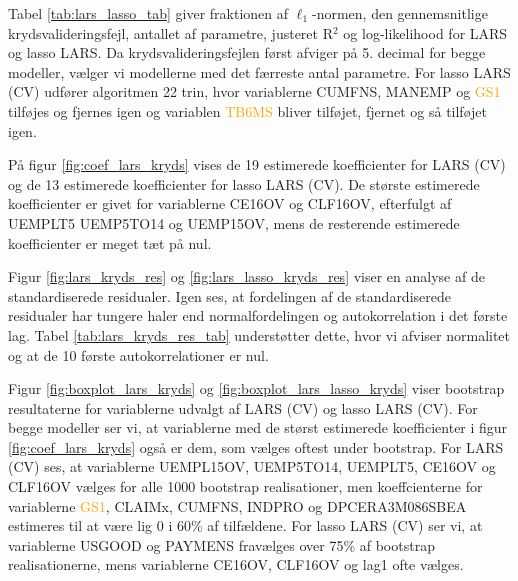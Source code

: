 
Tabel \ref{tab:lars_lasso_tab} giver fraktionen af \(\ell_1\)-normen, den gennemsnitlige krydsvalideringsfejl, antallet af parametre, justeret R$^2$ og log-likelihood for LARS og lasso LARS.
Da krydsvalideringsfejlen først afviger på 5. decimal for begge modeller, vælger vi modellerne med det færreste antal parametre. 
For lasso LARS (CV) udfører algoritmen 22 trin, hvor variablerne  \textcolor{chartreuse4}{CUMFNS}, \textcolor{blue3}{MANEMP} og \textcolor{orange}{GS1} tilføjes og fjernes igen og 
variablen \textcolor{orange}{TB6MS} bliver tilføjet, fjernet og så tilføjet igen.  

%

%
På figur \ref{fig:coef_lars_kryds} vises de 19 estimerede koefficienter for LARS (CV) og de 13 estimerede koefficienter for lasso LARS (CV). 
De største estimerede koefficienter er givet for variablerne \textcolor{blue3}{CE16OV} og \textcolor{blue3}{CLF16OV}, efterfulgt af \textcolor{blue3}{UEMPLT5} \textcolor{blue3}{UEMP5TO14} og \textcolor{blue3}{UEMP15OV}, mens de resterende estimerede koefficienter er meget tæt på nul.



Figur \ref{fig:lars_kryds_res} og \ref{fig:lars_lasso_kryds_res} viser en analyse af de standardiserede residualer.
Igen ses, at fordelingen af de standardiserede residualer har tungere haler end normalfordelingen og autokorrelation i det første lag. 
Tabel \ref{tab:lars_kryds_res_tab} understøtter dette, hvor vi afviser normalitet og at de 10 første autokorrelationer er nul. 

Figur \ref{fig:boxplot_lars_kryds} og \ref{fig:boxplot_lars_lasso_kryds} viser bootstrap resultaterne for variablerne udvalgt af LARS (CV) og lasso LARS (CV). 
For begge modeller ser vi, at variablerne med de størst estimerede koefficienter i figur \ref{fig:coef_lars_kryds} også er dem, som vælges oftest under bootstrap. 
For LARS (CV) ses, at variablerne \textcolor{blue3}{UEMPL15OV}, \textcolor{blue3}{UEMP5TO14}, \textcolor{blue3}{UEMPLT5}, \textcolor{blue3}{CE16OV} og \textcolor{blue3}{CLF16OV} vælges for alle 1000 bootstrap realisationer, men koeffcienterne for variablerne \textcolor{orange}{GS1}, \textcolor{blue3}{CLAIMx}, \textcolor{chartreuse4}{CUMFNS}, \textcolor{chartreuse4}{INDPRO} og \textcolor{red3}{DPCERA3M086SBEA} estimeres til at være lig 0 i 60\% af tilfældene.
For lasso LARS (CV) ser vi, at variablerne \textcolor{blue3}{USGOOD} og \textcolor{blue3}{PAYMENS} fravælges over 75\% af bootstrap realisationerne, mens variablerne \textcolor{blue3}{CE16OV}, \textcolor{blue3}{CLF16OV} og \textcolor{blue3}{lag1} ofte vælges. 

